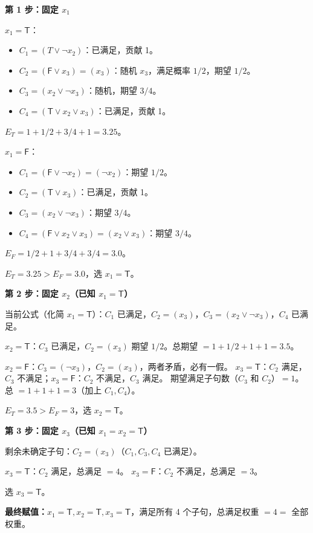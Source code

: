 \documentclass[UTF8,openany,12pt]{ctexbook}
\theoremstyle{remark}
\begin{document}
\textbf{第 1 步：固定 $x_1$}

$x_1 = \mathsf{T}$：
\begin{itemize}
  \item $C_1 = (T \vee \neg x_2)$：已满足，贡献 1。
  \item $C_2 = (\mathsf{F} \vee x_3)=(x_3)$：随机 $x_3$，满足概率 $1/2$，期望 $1/2$。
  \item $C_3 = (x_2 \vee \neg x_3)$：随机，期望 $3/4$。
  \item $C_4 = (\mathsf{T} \vee x_2 \vee x_3)$：已满足，贡献 1。
\end{itemize}
$E_T = 1 + 1/2 + 3/4 + 1 = 3.25$。

$x_1 = \mathsf{F}$：
\begin{itemize}
  \item $C_1 = (\mathsf{F} \vee \neg x_2) = (\neg x_2)$：期望 $1/2$。
  \item $C_2 = (\mathsf{T} \vee x_3)$：已满足，贡献 1。
  \item $C_3 = (x_2 \vee \neg x_3)$：期望 $3/4$。
  \item $C_4 = (\mathsf{F} \vee x_2 \vee x_3)=(x_2 \vee x_3)$：期望 $3/4$。
\end{itemize}
$E_F = 1/2 + 1 + 3/4 + 3/4 = 3.0$。

$E_T = 3.25 > E_F = 3.0$，选 $x_1 = \mathsf{T}$。

\textbf{第 2 步：固定 $x_2$（已知 $x_1=\mathsf{T}$）}

当前公式（化简 $x_1=\mathsf{T}$）：$C_1$ 已满足，$C_2=(x_3)$，$C_3=(x_2 \vee \neg x_3)$，$C_4$ 已满足。

$x_2 = \mathsf{T}$：$C_3$ 已满足，$C_2=(x_3)$ 期望 $1/2$。总期望 $= 1+1/2+1+1 = 3.5$。

$x_2 = \mathsf{F}$：$C_3=(\neg x_3)$，$C_2=(x_3)$，两者矛盾，必有一假。
$x_3=\mathsf{T}$：$C_2$ 满足，$C_3$ 不满足；$x_3=\mathsf{F}$：$C_2$ 不满足，$C_3$ 满足。
期望满足子句数（$C_3$ 和 $C_2$）$= 1$。总 $= 1+1+1 = 3$（加上 $C_1, C_4$）。

$E_T = 3.5 > E_F = 3$，选 $x_2 = \mathsf{T}$。

\textbf{第 3 步：固定 $x_3$（已知 $x_1=x_2=\mathsf{T}$）}

剩余未确定子句：$C_2=(x_3)$（$C_1,C_3,C_4$ 已满足）。

$x_3=\mathsf{T}$：$C_2$ 满足，总满足 $= 4$。
$x_3=\mathsf{F}$：$C_2$ 不满足，总满足 $= 3$。

选 $x_3 = \mathsf{T}$。

\textbf{最终赋值：}$x_1=\mathsf{T}, x_2=\mathsf{T}, x_3=\mathsf{T}$，满足所有 4 个子句，总满足权重 $= 4 = $ 全部权重。
\end{document}
